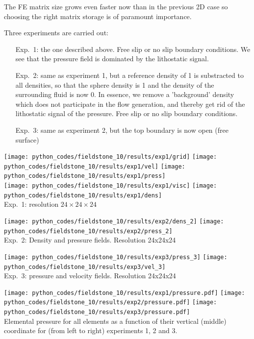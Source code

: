 The FE matrix size grows even faster now than in the previous 2D case so
choosing the right matrix storage is of paramount importance. 

Three experiments are carried out:
\begin{enumerate}
\item[Exp.~1:] the one described above.
Free slip or no slip boundary conditions.
We see that the pressure field is dominated by the lithostatic signal.
\item[Exp.~2:] same as experiment 1, but a reference density of 1 is substracted to all densities, so that 
the sphere density is 1 and the density of the surrounding fluid is now 0. In essence, we remove a
'background' density which does not participate in the flow generation, and thereby get rid of the 
lithostatic signal of the pressure.
Free slip or no slip boundary conditions.
\item[Exp.~3:] same as experiment 2, but the top boundary is now open (free surface)
\end{enumerate} 

\begin{center}
\texttt{[image: python\_codes/fieldstone\_10/results/exp1/grid]}
\texttt{[image: python\_codes/fieldstone\_10/results/exp1/vel]}
\texttt{[image: python\_codes/fieldstone\_10/results/exp1/press]}\\
\texttt{[image: python\_codes/fieldstone\_10/results/exp1/visc]}
\texttt{[image: python\_codes/fieldstone\_10/results/exp1/dens]}\\
{\small Exp.~1: resolution $24\times 24\times 24$}
\end{center}

\begin{center}
\texttt{[image: python\_codes/fieldstone\_10/results/exp2/dens\_2]}
\texttt{[image: python\_codes/fieldstone\_10/results/exp2/press\_2]}\\
{\small Exp.~2: Density and pressure fields. Resolution 24x24x24}
\end{center}


\begin{center}
\texttt{[image: python\_codes/fieldstone\_10/results/exp3/press\_3]}
\texttt{[image: python\_codes/fieldstone\_10/results/exp3/vel\_3]}\\
{\small Exp.~3: pressure and velocity fields. Resolution 24x24x24}
\end{center}

\begin{center}
\texttt{[image: python\_codes/fieldstone\_10/results/exp1/pressure.pdf]}
\texttt{[image: python\_codes/fieldstone\_10/results/exp2/pressure.pdf]}
\texttt{[image: python\_codes/fieldstone\_10/results/exp3/pressure.pdf]}\\
{\captionfont Elemental pressure for all elements as a function of their vertical 
(middle) coordinate for (from left to right) experiments 1, 2 and 3. }
\end{center}

